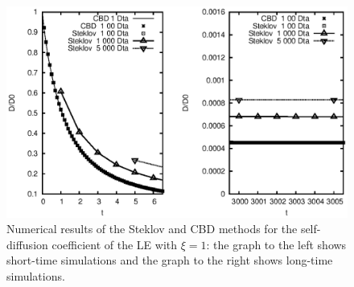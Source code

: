   \begin{figure}[h!]
    \begin{center}
        \includegraphics[width= \textwidth]{./papers/paperA/figures/short-longMSD.eps}
    \end{center}
    \caption{
      Numerical results of the Steklov and CBD methods for the self-diffusion coefficient
      of the LE with $\xi=1$: the graph to the left shows short-time simulations and the
      graph to the right  shows long-time simulations. }\label{fig:PlotXcubicMSD}%
  \end{figure}
